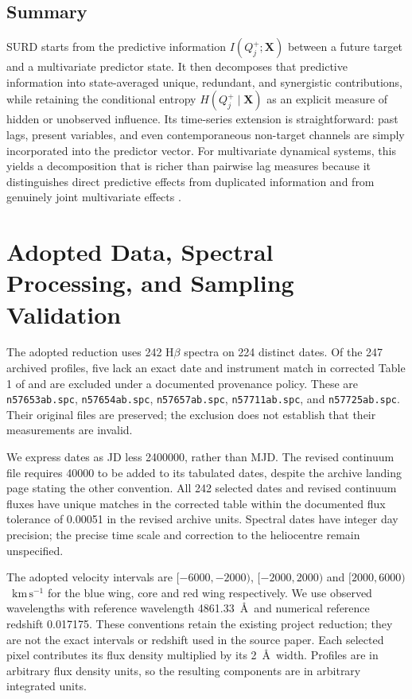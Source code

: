 \documentclass[fleqn,usenatbib]{mnras}
\begin{document}
\subsection{Summary}

SURD starts from the predictive information \(I(Q_j^+;\mathbf{X})\) between a future target and a multivariate predictor state. It then decomposes that predictive information into state-averaged unique, redundant, and synergistic contributions, while retaining the conditional entropy \(H(Q_j^+\mid \mathbf{X})\) as an explicit measure of hidden or unobserved influence. Its time-series extension is straightforward: past lags, present variables, and even contemporaneous non-target channels are simply incorporated into the predictor vector. For multivariate dynamical systems, this yields a decomposition that is richer than pairwise lag measures because it distinguishes direct predictive effects from duplicated information and from genuinely joint multivariate effects \cite{MartinezSanchez2024SURD,WilliamsBeer2010}.

\fi
\section{Adopted Data, Spectral Processing, and Sampling Validation}
\label{sec:data_processing}

The adopted reduction uses 242 H$\beta$ spectra on 224 distinct dates. Of the 247 archived profiles, five lack an exact date and instrument match in corrected Table 1 of \citet{WandersPeterson1996} and are excluded under a documented provenance policy. These are \texttt{n57653ab.spc}, \texttt{n57654ab.spc}, \texttt{n57657ab.spc}, \texttt{n57711ab.spc}, and \texttt{n57725ab.spc}. Their original files are preserved; the exclusion does not establish that their measurements are invalid.

We express dates as JD less 2400000, rather than MJD. The revised continuum file requires 40000 to be added to its tabulated dates, despite the archive landing page stating the other convention. All 242 selected dates and revised continuum fluxes have unique matches in the corrected table within the documented flux tolerance of 0.00051 in the revised archive units. Spectral dates have integer day precision; the precise time scale and correction to the heliocentre remain unspecified.

The adopted velocity intervals are $[-6000,-2000)$, $[-2000,2000)$ and $[2000,6000)$~$\mathrm{km\,s^{-1}}$ for the blue wing, core and red wing respectively. We use observed wavelengths with reference wavelength 4861.33~\AA\ and numerical reference redshift 0.017175. These conventions retain the existing project reduction; they are not the exact intervals or redshift used in the source paper. Each selected pixel contributes its flux density multiplied by its 2~\AA\ width. Profiles are in arbitrary flux density units, so the resulting components are in arbitrary integrated units.
\end{document}
